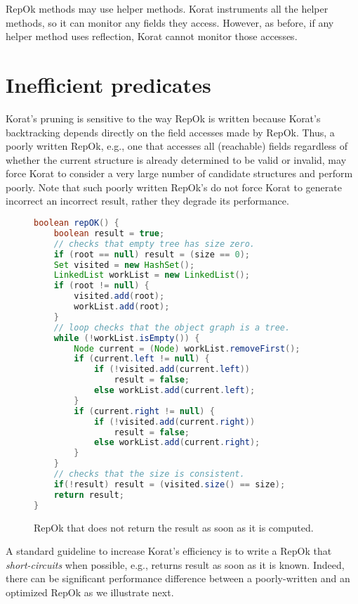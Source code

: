 RepOk methods may use helper methods.  Korat instruments all the
helper methods, so it can monitor any fields they access.  However, as
before, if any helper method uses reflection, Korat cannot monitor
those accesses.

\section{Inefficient predicates}
\label{sec:inefficient-predicates}

Korat's pruning is sensitive to the way RepOk is written because
Korat's backtracking depends directly on the field accesses made by
RepOk.  Thus, a poorly written RepOk, e.g., one that accesses all
(reachable) fields regardless of whether the current structure is
already determined to be valid or invalid, may force Korat to consider
a very large number of candidate structures and perform poorly.  Note
that such poorly written RepOk's do not force Korat to generate
incorrect an incorrect result, rather they degrade its performance.

\begin{figure}
\centering
\begin{lstlisting}[language=Java]
boolean repOK() {
    boolean result = true;
    // checks that empty tree has size zero.
    if (root == null) result = (size == 0);
    Set visited = new HashSet();
    LinkedList workList = new LinkedList();
    if (root != null) {
        visited.add(root);
        workList.add(root);
    }
    // loop checks that the object graph is a tree.
    while (!workList.isEmpty()) {
        Node current = (Node) workList.removeFirst();
        if (current.left != null) {
            if (!visited.add(current.left))
                result = false;
            else workList.add(current.left);
        }
        if (current.right != null) {
            if (!visited.add(current.right)) 
                result = false;
            else workList.add(current.right);
        }
    }
    // checks that the size is consistent.
    if(!result) result = (visited.size() == size);
    return result;
}
\end{lstlisting}
\caption{RepOk that does not return the result as soon as it is computed.}
\label{fig:bTreeInefficient}
\end{figure}

A standard guideline to increase Korat's efficiency is to write a
RepOk that \emph{short-circuits} when possible, e.g., returns result
as soon as it is known.  Indeed, there can be significant
performance difference between a poorly-written and an optimized RepOk
as we illustrate next.

